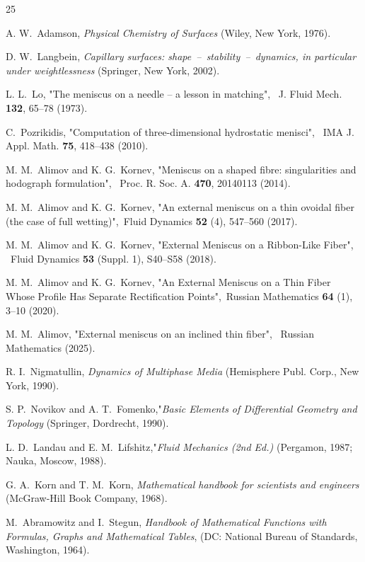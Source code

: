\documentclass[
11pt,%
tightenlines,%
twoside,%
onecolumn,%
nofloats,%
nobibnotes,%
nofootinbib,%
superscriptaddress,%
noshowpacs,%
centertags]%
{revtex4-2}
\begin{document}
\begin{thebibliography}{25}

A. W.~Adamson, \textit{Physical Chemistry of Surfaces} (Wiley, New York, 1976).

D. W.~Langbein, \textit{Capillary surfaces: shape~--~stability~--~dynamics, in particular under
weightlessness} (Springer, New York, 2002).

L. L.~Lo,  "{The meniscus on a needle -- a lesson in matching}", \ J. Fluid Mech. \textbf{132},
65--78 (1973).

C.~Pozrikidis, "{Computation of three-dimensional hydrostatic menisci}", \ IMA J. Appl. Math.
\textbf{75}, 418--438 (2010).

M. M.~Alimov and K. G.~Kornev, "{Meniscus on a shaped fibre: singularities and hodograph
formulation}", \ Proc. R. Soc. A.  \textbf{470}, 20140113 (2014).

M. M.~Alimov and K. G.~Kornev, "{An external meniscus on a thin ovoidal fiber (the case of full
wetting)}",\  Fluid Dynamics  \textbf{52} (4), 547--560 (2017).

M. M.~Alimov and K. G.~Kornev, "{External Meniscus on a Ribbon-Like Fiber}", \ Fluid Dynamics
\textbf{53} (Suppl. 1), S40--S58 (2018).

M. M.~Alimov and K. G.~Kornev, "{An External Meniscus on a Thin Fiber Whose Profile Has Separate
Rectification Points}",\  Russian Mathematics \textbf{64} (1), 3--10 (2020).

M. M.~Alimov, "{External meniscus on an inclined thin fiber}", \  Russian Mathematics
(2025).

R. I.~Nigmatullin, \textit{Dynamics of Multiphase Media} (Hemisphere Publ. Corp., New York, 1990).

S. P.~Novikov and A. T.~Fomenko,"\textit{Basic Elements of Differential Geometry and Topology}
(Springer, Dordrecht, 1990).

L. D.~Landau and E. M.~Lifshitz,"\textit{Fluid Mechanics (2nd Ed.)} (Pergamon, 1987; Nauka, Moscow,
1988).

G. A.~Korn and T. M.~Korn, \textit{Mathematical handbook for scientists and engineers} (McGraw-Hill
Book Company, 1968).

M.~Abramowitz and I.~Stegun, \textit{Handbook of Mathematical Functions with Formulas, Graphs and
Mathematical Tables}, (DC: National Bureau of Standards, Washington, 1964).


\end{thebibliography}
\end{document}
